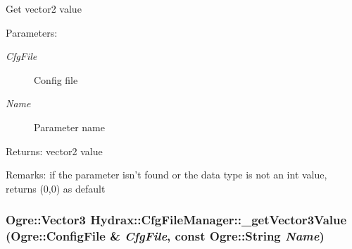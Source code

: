 Get vector2 value \begin{Desc}
\item[Parameters:]
\begin{description}
\item[{\em CfgFile}]Config file \item[{\em Name}]Parameter name \end{description}
\end{Desc}
\begin{Desc}
\item[Returns:]vector2 value \end{Desc}
\begin{Desc}
\item[Remarks:]if the parameter isn't found or the data type is not an int value, returns (0,0) as default \end{Desc}
\hypertarget{class_hydrax_1_1_cfg_file_manager_573e9bca71aa4fffbf84c5409c84f9ae}{
\subsubsection[{\_\-getVector3Value}]{\setlength{\rightskip}{0pt plus 5cm}Ogre::Vector3 Hydrax::CfgFileManager::\_\-getVector3Value (Ogre::ConfigFile \& {\em CfgFile}, \/  const Ogre::String {\em Name})}}
\label{class_hydrax_1_1_cfg_file_manager_573e9bca71aa4fffbf84c5409c84f9ae}


